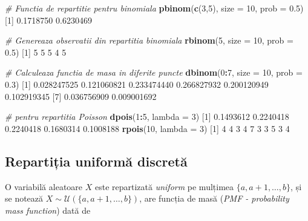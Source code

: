 \documentclass[]{article}
\newenvironment{Shaded}{\begin{snugshade}}{\end{snugshade}}
\newcommand{\CommentTok}[1]{\textcolor[rgb]{0.56,0.35,0.01}{\textit{#1}}}
\newcommand{\DataTypeTok}[1]{\textcolor[rgb]{0.13,0.29,0.53}{#1}}
\newcommand{\DecValTok}[1]{\textcolor[rgb]{0.00,0.00,0.81}{#1}}
\newcommand{\FloatTok}[1]{\textcolor[rgb]{0.00,0.00,0.81}{#1}}
\newcommand{\KeywordTok}[1]{\textcolor[rgb]{0.13,0.29,0.53}{\textbf{#1}}}
\newcommand{\NormalTok}[1]{#1}
\newcommand{\OperatorTok}[1]{\textcolor[rgb]{0.81,0.36,0.00}{\textbf{#1}}}
\begin{document}
\begin{Shaded}
\begin{Highlighting}[]
\CommentTok{# Functia de repartitie pentru binomiala}
\KeywordTok{pbinom}\NormalTok{(}\KeywordTok{c}\NormalTok{(}\DecValTok{3}\NormalTok{,}\DecValTok{5}\NormalTok{), }\DataTypeTok{size =} \DecValTok{10}\NormalTok{, }\DataTypeTok{prob =} \FloatTok{0.5}\NormalTok{)}
\NormalTok{[}\DecValTok{1}\NormalTok{] }\FloatTok{0.1718750} \FloatTok{0.6230469}

\CommentTok{# Genereaza observatii din repartitia binomiala}
\KeywordTok{rbinom}\NormalTok{(}\DecValTok{5}\NormalTok{, }\DataTypeTok{size =} \DecValTok{10}\NormalTok{, }\DataTypeTok{prob =} \FloatTok{0.5}\NormalTok{)}
\NormalTok{[}\DecValTok{1}\NormalTok{] }\DecValTok{5} \DecValTok{5} \DecValTok{5} \DecValTok{4} \DecValTok{5}

\CommentTok{# Calculeaza functia de masa in diferite puncte}
\KeywordTok{dbinom}\NormalTok{(}\DecValTok{0}\OperatorTok{:}\DecValTok{7}\NormalTok{, }\DataTypeTok{size =} \DecValTok{10}\NormalTok{, }\DataTypeTok{prob =} \FloatTok{0.3}\NormalTok{)}
\NormalTok{[}\DecValTok{1}\NormalTok{] }\FloatTok{0.028247525} \FloatTok{0.121060821} \FloatTok{0.233474440} \FloatTok{0.266827932} \FloatTok{0.200120949} \FloatTok{0.102919345}
\NormalTok{[}\DecValTok{7}\NormalTok{] }\FloatTok{0.036756909} \FloatTok{0.009001692}

\CommentTok{# pentru repartitia Poisson}
\KeywordTok{dpois}\NormalTok{(}\DecValTok{1}\OperatorTok{:}\DecValTok{5}\NormalTok{, }\DataTypeTok{lambda =} \DecValTok{3}\NormalTok{)}
\NormalTok{[}\DecValTok{1}\NormalTok{] }\FloatTok{0.1493612} \FloatTok{0.2240418} \FloatTok{0.2240418} \FloatTok{0.1680314} \FloatTok{0.1008188}
\KeywordTok{rpois}\NormalTok{(}\DecValTok{10}\NormalTok{, }\DataTypeTok{lambda =} \DecValTok{3}\NormalTok{)}
\NormalTok{ [}\DecValTok{1}\NormalTok{] }\DecValTok{4} \DecValTok{4} \DecValTok{3} \DecValTok{4} \DecValTok{7} \DecValTok{3} \DecValTok{3} \DecValTok{5} \DecValTok{3} \DecValTok{4}
\end{Highlighting}
\end{Shaded}

\hypertarget{repartiux21bia-uniformux103-discretux103}{%
\subsection{Repartiția uniformă
discretă}\label{repartiux21bia-uniformux103-discretux103}}

O variabilă aleatoare \(X\) este repartizată \emph{uniform} pe mulțimea
\(\{a, a+1, \ldots, b\}\), și se notează
\(X\sim\mathcal{U}(\{a, a+1, \ldots, b\})\), are funcția de masă
(\emph{PMF - probability mass function}) dată de
\end{document}

